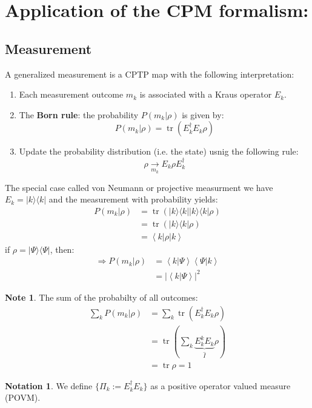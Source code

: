 \documentclass[12pt]{book}
\theoremstyle{definition}
\newtheorem*{note}{\bfseries Note}
\newtheorem*{notation}{\bfseries Notation}
\newcommand{\scalar}[1]{\left\langle {#1}\right\rangle}
\newcommand{\abs}[1]{\left\vert {#1}\right\vert}
\let\oldsum\sum
\renewcommand{\sum}[2]{\oldsum\limits_{#1}^{#2}}
\renewcommand{\to}{\longrightarrow}
\newcommand{\para}[1]{\left( {#1} \right)}
\newcommand{\bra}[1]{\langle {#1} \vert}
\newcommand{\ket}[1]{\vert {#1} \rangle}
\DeclareMathOperator{\tr}{tr}
\begin{document}
\section{Application of the CPM formalism:}
\subsection{Measurement}
A generalized measurement is a CPTP map with the following interpretation:
\begin{enumerate}[label = (\roman*)]
  \item Each measurement outcome $m_k$ is associated with a Kraus operator $E_k$.
  \item The \textbf{Born rule}: the probability $P(m_k \vert \rho)$ is given by:
  \begin{equation}
    P(m_k \vert \rho) = \tr(E_k^\dagger E_k \rho)
  \end{equation}
  \item Update the probability distribution (i.e. the state) usnig the following rule:
  \begin{equation}
    \rho \underset{m_k}{\to} E_k \rho E_k^\dagger
  \end{equation}
\end{enumerate}
The special case called von Neumann or projective measurment we have $E_k = \ket{k}\bra{k}$ and the measurement with probability yields:
\begin{align*}
  P(m_k \vert \rho) & = \tr(\ket{k}\bra{k} \ket{k}\bra{k} \rho) \\
  & = \tr(\ket{k} \bra{k} \rho) \\
  & = \scalar{k \vert \rho \vert k}
\end{align*}
if $\rho = \ket{\Psi} \bra{\Psi}$, then:
\begin{align*}
  \Longrightarrow P(m_k \vert \rho) & = \scalar{k \vert \Psi} \scalar{\Psi \vert k} \\
  & = \abs{\scalar{k \vert \Psi}}^2
\end{align*}
\begin{note}
  The sum of the probabilty of all outcomes:
  \begin{align*}
    \oldsum_k P(m_k \vert \rho) & = \oldsum_k \tr(E_k^\dagger E_k \rho) \\
    & = \tr\para{\oldsum_k \underbrace{E_k^k E_k}_{\hat I} \rho} \\
    & = \tr \rho = 1
  \end{align*}
\end{note}
\begin{notation}
  We define $\{\Pi_k := E_k^\dagger E_k \}$ as a positive operator valued measure (POVM).
\end{notation}
\end{document}
